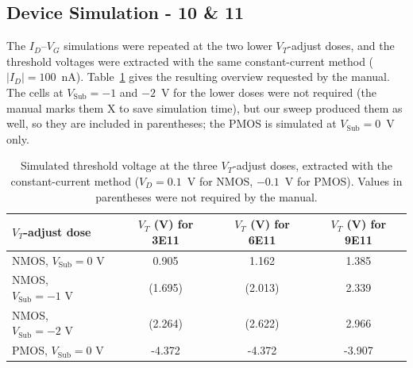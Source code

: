 \subsection{Device Simulation - 10 \& 11}

The $I_D$--$V_G$ simulations were repeated at the two lower $V_T$-adjust doses, and the threshold voltages were extracted with the same constant-current method ($|I_D| = 100$~nA). Table~\ref{tab:vt_adjust} gives the resulting overview requested by the manual. The cells at $V_\text{Sub} = -1$ and $-2$~V for the lower doses were not required (the manual marks them X to save simulation time), but our sweep produced them as well, so they are included in parentheses; the PMOS is simulated at $V_\text{Sub} = 0$~V only.

\begin{table}[H]
    \centering
    \caption{Simulated threshold voltage at the three $V_T$-adjust doses, extracted with the constant-current method ($V_D = 0.1$~V for NMOS, $-0.1$~V for PMOS). Values in parentheses were not required by the manual.}
    \label{tab:vt_adjust}
    \begin{tabular}{ l c c c}
        \toprule
        \textbf{$V_T$-adjust dose} & \textbf{$V_T$ (V) for 3E11} & \textbf{$V_T$ (V) for 6E11} & \textbf{$V_T$ (V) for 9E11} \\
        \midrule
        NMOS, $V_{\text{Sub}} = 0\text{ V}$  & 0.905  & 1.162  & 1.385 \\
        NMOS, $V_{\text{Sub}} = -1\text{ V}$ & (1.695) & (2.013) & 2.339 \\
        NMOS, $V_{\text{Sub}} = -2\text{ V}$ & (2.264) & (2.622) & 2.966 \\
        PMOS, $V_{\text{Sub}} = 0\text{ V}$  & -4.372 & -4.372 & -3.907 \\
        \bottomrule
    \end{tabular}
\end{table}

